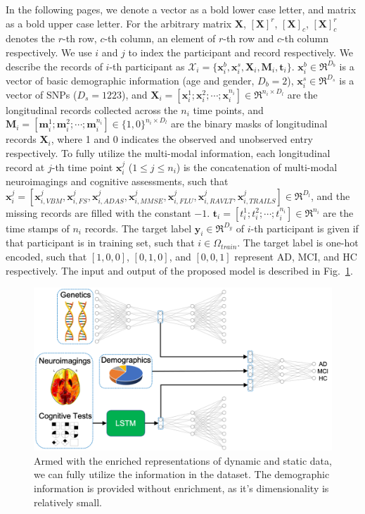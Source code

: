 In the following pages, we denote a vector as a bold lower case letter, and matrix as a bold upper case letter. For the arbitrary matrix $\mathbf{X}$, $[\mathbf{X}]^r$, $[\mathbf{X}]_c$, $[\mathbf{X}]^r_c$ denotes the $r$-th row, $c$-th column, an element of $r$-th row and $c$-th column respectively. We use $i$ and $j$ to index the participant and record respectively. We describe the records of $i$-th participant as $\mathcal{X}_i = \{\mathbf{x}_i^b, \mathbf{x}_i^s, \mathbf{X}_i, \mathbf{M}_i, \mathbf{t}_i\}$. $\mathbf{x}_i^b \in \Re^{D_b}$ is a vector of basic demographic information (age and gender, $D_b = 2$), $\mathbf{x}_i^s \in \Re^{D_s}$ is a vector of SNPs ($D_s = 1223$), and $\mathbf{X}_i = [\mathbf{x}_i^1; \mathbf{x}_i^2; \cdots; \mathbf{x}_i^{n_i}] \in \Re^{n_i \times D_l}$ are the longitudinal records collected across the $n_i$ time points, and $\mathbf{M}_i = [\mathbf{m}_i^1; \mathbf{m}_i^2; \cdots; \mathbf{m}_i^{n_i}] \in \{1, 0\}^{n_i \times D_l}$ are the binary masks of longitudinal records $\mathbf{X}_i$, where 1 and 0 indicates the observed and unobserved entry respectively. To fully utilize the multi-modal information, each longitudinal record at $j$-th time point $\mathbf{x}_i^j$ ($1 \leq j \leq n_i$) is the concatenation of multi-modal neuroimagings and cognitive assessments, such that $\mathbf{x}_i^j = [\mathbf{x}_{i,VBM}^j,\mathbf{x}_{i,FS}^j,\mathbf{x}_{i,ADAS}^j,\mathbf{x}_{i,MMSE}^j,\mathbf{x}_{i,FLU}^j,\mathbf{x}_{i,RAVLT}^j,\mathbf{x}_{i,TRAILS}^j] \in \Re^{D_l}$, and the missing records are filled with the constant $-1$. $\mathbf{t}_i = [t_i^1; t_i^2; \cdots; t_i^{n_i}] \in \Re^{n_i}$ are the time stamps of $n_i$ records. The target label $\mathbf{y}_i \in \Re^{D_y}$ of $i$-th participant is given if that participant is in training set, such that $i \in \Omega_{train}$. The target label is one-hot encoded, such that $[1, 0, 0]$, $[0, 1, 0]$, and $[0, 0, 1]$ represent AD, MCI, and HC respectively. The input and output of the proposed model is described in Fig.~\ref{fig: final-inputs}.
\begin{figure}
    \includegraphics[width=\textwidth]{images/final-inputs.png}
    \caption{Armed with the enriched representations of dynamic and static data, we can fully utilize the information in the dataset. The demographic information is provided without enrichment, as it's dimensionality is relatively small.} \label{fig: final-inputs}
\end{figure}

